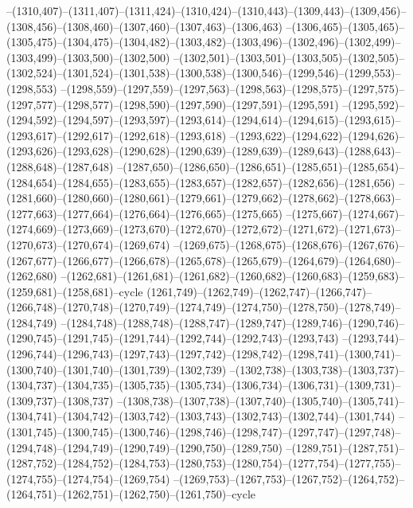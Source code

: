 --(1310,407)--(1311,407)--(1311,424)--(1310,424)--(1310,443)--(1309,443)--(1309,456)--(1308,456)--(1308,460)--(1307,460)--(1307,463)--(1306,463)
--(1306,465)--(1305,465)--(1305,475)--(1304,475)--(1304,482)--(1303,482)--(1303,496)--(1302,496)--(1302,499)--(1303,499)--(1303,500)--(1302,500)
--(1302,501)--(1303,501)--(1303,505)--(1302,505)--(1302,524)--(1301,524)--(1301,538)--(1300,538)--(1300,546)--(1299,546)--(1299,553)--(1298,553)
--(1298,559)--(1297,559)--(1297,563)--(1298,563)--(1298,575)--(1297,575)--(1297,577)--(1298,577)--(1298,590)--(1297,590)--(1297,591)--(1295,591)
--(1295,592)--(1294,592)--(1294,597)--(1293,597)--(1293,614)--(1294,614)--(1294,615)--(1293,615)--(1293,617)--(1292,617)--(1292,618)--(1293,618)
--(1293,622)--(1294,622)--(1294,626)--(1293,626)--(1293,628)--(1290,628)--(1290,639)--(1289,639)--(1289,643)--(1288,643)--(1288,648)--(1287,648)
--(1287,650)--(1286,650)--(1286,651)--(1285,651)--(1285,654)--(1284,654)--(1284,655)--(1283,655)--(1283,657)--(1282,657)--(1282,656)--(1281,656)
--(1281,660)--(1280,660)--(1280,661)--(1279,661)--(1279,662)--(1278,662)--(1278,663)--(1277,663)--(1277,664)--(1276,664)--(1276,665)--(1275,665)
--(1275,667)--(1274,667)--(1274,669)--(1273,669)--(1273,670)--(1272,670)--(1272,672)--(1271,672)--(1271,673)--(1270,673)--(1270,674)--(1269,674)
--(1269,675)--(1268,675)--(1268,676)--(1267,676)--(1267,677)--(1266,677)--(1266,678)--(1265,678)--(1265,679)--(1264,679)--(1264,680)--(1262,680)
--(1262,681)--(1261,681)--(1261,682)--(1260,682)--(1260,683)--(1259,683)--(1259,681)--(1258,681)--cycle
(1261,749)--(1262,749)--(1262,747)--(1266,747)--(1266,748)--(1270,748)--(1270,749)--(1274,749)--(1274,750)--(1278,750)--(1278,749)--(1284,749)
--(1284,748)--(1288,748)--(1288,747)--(1289,747)--(1289,746)--(1290,746)--(1290,745)--(1291,745)--(1291,744)--(1292,744)--(1292,743)--(1293,743)
--(1293,744)--(1296,744)--(1296,743)--(1297,743)--(1297,742)--(1298,742)--(1298,741)--(1300,741)--(1300,740)--(1301,740)--(1301,739)--(1302,739)
--(1302,738)--(1303,738)--(1303,737)--(1304,737)--(1304,735)--(1305,735)--(1305,734)--(1306,734)--(1306,731)--(1309,731)--(1309,737)--(1308,737)
--(1308,738)--(1307,738)--(1307,740)--(1305,740)--(1305,741)--(1304,741)--(1304,742)--(1303,742)--(1303,743)--(1302,743)--(1302,744)--(1301,744)
--(1301,745)--(1300,745)--(1300,746)--(1298,746)--(1298,747)--(1297,747)--(1297,748)--(1294,748)--(1294,749)--(1290,749)--(1290,750)--(1289,750)
--(1289,751)--(1287,751)--(1287,752)--(1284,752)--(1284,753)--(1280,753)--(1280,754)--(1277,754)--(1277,755)--(1274,755)--(1274,754)--(1269,754)
--(1269,753)--(1267,753)--(1267,752)--(1264,752)--(1264,751)--(1262,751)--(1262,750)--(1261,750)--cycle

